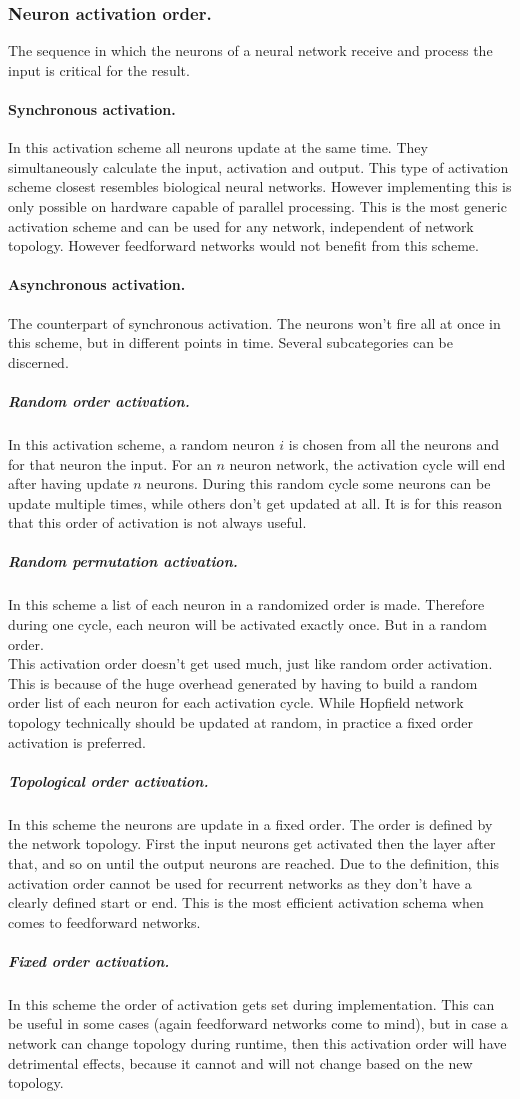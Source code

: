 \documentclass[pdftex,a4paper,12pt,twoside]{report}
\theoremstyle{plain} \newtheorem{theorem}{Theorem} \newtheorem{proposition}{Proposition} \newtheorem{lemma}{Lemma} \newtheorem*{corollary}{Corollary}
\theoremstyle{definition} \newtheorem{definition}{Definition} \newtheorem{conjecture}{Conjecture} \newtheorem*{example}{Example} \newtheorem{algorithm}{Algorithm}
\theoremstyle{remark} \newtheorem*{remark}{Remark} \newtheorem*{note}{Note} \newtheorem{case}{Case}
\begin{document}
\subsubsection{Neuron activation order.}
The sequence in which the neurons of a neural network receive and process the input is critical for the result.
\paragraph{Synchronous activation.}
In this activation scheme all neurons update at the same time. They simultaneously calculate the input, activation and output. This type of activation scheme closest resembles biological neural networks. However implementing this is only possible on hardware capable of parallel processing. This is the most generic activation scheme and can be used for any network, independent of network topology. However feedforward networks would not benefit from this scheme.
\paragraph{Asynchronous activation.}
The counterpart of synchronous activation. The neurons won't fire all at once in this scheme, but in different points in time. Several subcategories can be discerned. 
\subparagraph{Random order activation.}
In this activation scheme, a random neuron $i$ is chosen from all the neurons and for that neuron the input. For an $n$ neuron network, the activation cycle will end after having update $n$ neurons. During this random cycle some neurons can be update multiple times, while others don't get updated at all. It is for this reason that this order of activation is not always useful.
\subparagraph{Random permutation activation.}
In this scheme a list of each neuron in a randomized order is made. Therefore during one cycle, each neuron will be activated exactly once. But in a random order.\\
This activation order doesn't get used much, just like random order activation. This is because of the huge overhead generated by having to build a random order list of each neuron for each activation cycle. While Hopfield network topology technically should be updated at random, in practice a fixed order activation is preferred.
\subparagraph{Topological order activation.}
In this scheme the neurons are update in a fixed order. The order is defined by the network topology. First the input neurons get activated then the layer after that, and so on until the output neurons are reached. Due to the definition, this activation order cannot be used for recurrent networks as they don't have a clearly defined start or end. This is the most efficient activation schema when comes to feedforward networks.
\subparagraph{Fixed order activation.}
In this scheme the order of activation gets set during implementation. This can be useful in some cases (again feedforward networks come to mind), but in case a network can change topology during runtime, then this activation order will have detrimental effects, because it cannot and will not change based on the new topology.
\end{document}
